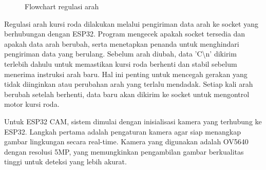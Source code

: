 \begin{figure}[H]
{
  }
  \caption{Flowchart regulasi arah}
\end{figure}

Regulasi arah kursi roda dilakukan melalui pengiriman data arah ke socket yang berhubungan dengan ESP32. Program mengecek apakah socket tersedia dan apakah data arah berubah, serta menetapkan penanda untuk menghindari pengiriman data yang berulang. Sebelum arah diubah, data 'C\textbackslash n' dikirim terlebih dahulu untuk memastikan kursi roda berhenti dan stabil sebelum menerima instruksi arah baru. Hal ini penting untuk mencegah gerakan yang tidak diinginkan atau perubahan arah yang terlalu mendadak. Setiap kali arah berubah setelah berhenti, data baru akan dikirim ke socket untuk mengontrol motor kursi roda.

Untuk ESP32 CAM, sistem dimulai dengan inisialisasi kamera yang terhubung ke ESP32. Langkah pertama adalah pengaturan kamera agar siap menangkap gambar lingkungan secara real-time. Kamera yang digunakan adalah OV5640 dengan resolusi 5MP, yang memungkinkan pengambilan gambar berkualitas tinggi untuk deteksi yang lebih akurat.


